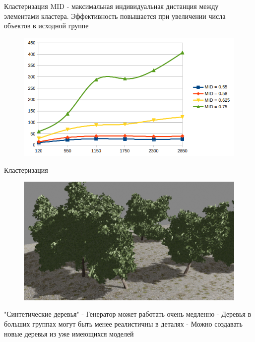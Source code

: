 \documentclass[14pt]{beamer}
\begin{document}
\begin{frame}{Кластеризация}
MID - максимальная индивидуальная дистанция между элементами
кластера.
Эффективность повышается при увеличении числа объектов в исходной группе
\begin{figure}[hbtp]
\includegraphics[scale=0.58]{stat3.png}
\end{figure}
\end{frame}
\begin{frame}{Кластеризация}
\begin{figure}[hbtp]
\includegraphics[scale=0.17]{gltf_scene.png}
\end{figure}
\end{frame}

\begin{frame}{"Синтетические деревья"}
 - Генератор может работать очень медленно\linebreak	
 - Деревья в больших группах могут быть менее реалистичны в деталях \linebreak	
 - Можно создавать новые деревья из уже имеющихся моделей

\end{frame}
\end{document}
